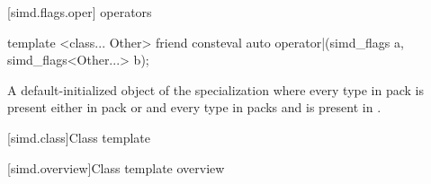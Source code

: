 
[simd.flags.oper]{ operators}

\begin{itemdecl}
template <class... Other>
  friend consteval auto operator|(simd_flags a, simd_flags<Other...> b);
\end{itemdecl}

\begin{itemdescr}
  \pnum\returns
  A default-initialized object of the specialization
   where every type in pack  is
  present either in pack  or  and every type in packs
   and  is present in .
\end{itemdescr}

[simd.class]{Class template }

[simd.overview]{Class template  overview}

